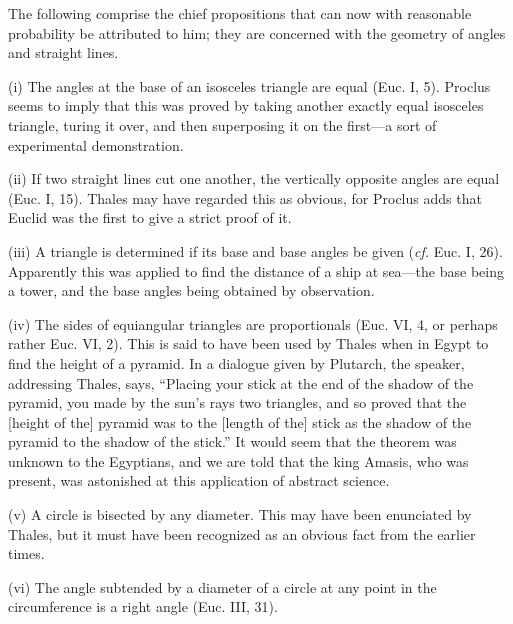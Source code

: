 \documentclass[12pt,oneside]{book}
\begin{document}
The following comprise the chief propositions that can now with reasonable probability be attributed to him; they are concerned with the geometry of angles and straight lines. \par 

\hfill\begin{minipage}{\dimexpr\textwidth-2cm}
(i) The angles at the base of an isosceles triangle are equal (Euc. I, 5). Proclus seems to imply that this was proved by taking another exactly equal isosceles triangle, turing it over, and then superposing it on the first---a sort of experimental demonstration. \par 

(ii) If two straight lines cut one another, the vertically opposite angles are equal (Euc. I, 15). Thales may have regarded this as obvious, for Proclus adds that Euclid was the first to give a strict proof of it. \par 

(iii) A triangle is determined if its base and base angles be given (\textit{cf.} Euc. I, 26). Apparently this was applied to find the distance of a ship at sea---the base being a tower, and the base angles being obtained by observation. \par 

(iv) The sides of equiangular triangles are proportionals (Euc. VI, 4, or perhaps rather Euc. VI, 2). This is said to have been used by Thales when in Egypt to find the height of a pyramid. In a dialogue given by Plutarch, the speaker, addressing Thales, says, ``Placing your stick at the end of the shadow of the pyramid, you made by the sun's rays two triangles, and so proved that the [height of the] pyramid was to the [length of the] stick as the shadow of the pyramid to the shadow of the stick.'' It would seem that the theorem was unknown to the Egyptians, and we are told that the king Amasis, who was present, was astonished at this application of abstract science. \par 

(v) A circle is bisected by any diameter. This may have been enunciated by Thales, but it must have been recognized as an obvious fact from the earlier times. \par 

(vi) The angle subtended by a diameter of a circle at any point in the circumference is a right angle (Euc. III, 31). 
\end{minipage}
\end{document}
